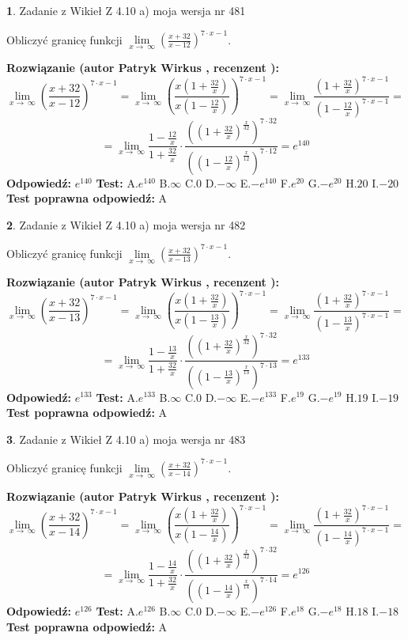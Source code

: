 \documentclass[12pt, a4paper]{article}
\theoremstyle{definition} %
\newtheorem{zad}{}
\newcommand{\zadStart}[1]{\begin{zad}#1\newline}
\newcommand{\zadStop}{\end{zad}}
\newcommand{\rozwStart}[2]{\noindent \textbf{Rozwiązanie (autor #1 , recenzent #2): }\newline}
\newcommand{\rozwStop}{\newline}
\newcommand{\odpStart}{\noindent \textbf{Odpowiedź:}\newline}
\newcommand{\odpStop}{\newline}
\newcommand{\testStart}{\noindent \textbf{Test:}\newline}
\newcommand{\testStop}{\newline}
\newcommand{\kluczStart}{\noindent \textbf{Test poprawna odpowiedź:}\newline}
\newcommand{\kluczStop}{\newline}
\begin{document}
\zadStart{Zadanie z Wikieł Z 4.10 a) moja wersja nr 481}

Obliczyć granicę funkcji  $\lim\limits_{x\to\ \infty}(\frac{x+32}{x-12})^{7\cdot x-1}$.
\zadStop
\rozwStart{Patryk Wirkus}{}
$$\lim\limits_{x\to\ \infty}(\frac{x+32}{x-12})^{7\cdot x-1} = \lim\limits_{x\to\ \infty}(\frac{x(1+\frac{32}{x})}{x(1-\frac{12}{x})})^{7\cdot x-1}=\lim\limits_{x\to\ \infty}\frac{(1+\frac{32}{x})^{7\cdot x-1}}{(1-\frac{12}{x})^{7\cdot x-1}}=$$
$$=\lim\limits_{x\to\ \infty}\frac{1-\frac{12}{x}}{1+\frac{32}{x}}\cdot\frac{((1+\frac{32}{x})^{\frac{x}{32}})^{7\cdot32}}{((1-\frac{12}{x})^{\frac{x}{12}})^{7\cdot12}}=e^{140}$$
\rozwStop
\odpStart
$e^{140}$
\odpStop
\testStart
A.$e^{140}$ B.$\infty$ C.$0$ D.$-\infty$ E.$-e^{140}$
F.$e^{20}$ G.$-e^{20}$
H.$20$
I.$-20$
\testStop
\kluczStart
A
\kluczStop



\zadStart{Zadanie z Wikieł Z 4.10 a) moja wersja nr 482}

Obliczyć granicę funkcji  $\lim\limits_{x\to\ \infty}(\frac{x+32}{x-13})^{7\cdot x-1}$.
\zadStop
\rozwStart{Patryk Wirkus}{}
$$\lim\limits_{x\to\ \infty}(\frac{x+32}{x-13})^{7\cdot x-1} = \lim\limits_{x\to\ \infty}(\frac{x(1+\frac{32}{x})}{x(1-\frac{13}{x})})^{7\cdot x-1}=\lim\limits_{x\to\ \infty}\frac{(1+\frac{32}{x})^{7\cdot x-1}}{(1-\frac{13}{x})^{7\cdot x-1}}=$$
$$=\lim\limits_{x\to\ \infty}\frac{1-\frac{13}{x}}{1+\frac{32}{x}}\cdot\frac{((1+\frac{32}{x})^{\frac{x}{32}})^{7\cdot32}}{((1-\frac{13}{x})^{\frac{x}{13}})^{7\cdot13}}=e^{133}$$
\rozwStop
\odpStart
$e^{133}$
\odpStop
\testStart
A.$e^{133}$ B.$\infty$ C.$0$ D.$-\infty$ E.$-e^{133}$
F.$e^{19}$ G.$-e^{19}$
H.$19$
I.$-19$
\testStop
\kluczStart
A
\kluczStop



\zadStart{Zadanie z Wikieł Z 4.10 a) moja wersja nr 483}

Obliczyć granicę funkcji  $\lim\limits_{x\to\ \infty}(\frac{x+32}{x-14})^{7\cdot x-1}$.
\zadStop
\rozwStart{Patryk Wirkus}{}
$$\lim\limits_{x\to\ \infty}(\frac{x+32}{x-14})^{7\cdot x-1} = \lim\limits_{x\to\ \infty}(\frac{x(1+\frac{32}{x})}{x(1-\frac{14}{x})})^{7\cdot x-1}=\lim\limits_{x\to\ \infty}\frac{(1+\frac{32}{x})^{7\cdot x-1}}{(1-\frac{14}{x})^{7\cdot x-1}}=$$
$$=\lim\limits_{x\to\ \infty}\frac{1-\frac{14}{x}}{1+\frac{32}{x}}\cdot\frac{((1+\frac{32}{x})^{\frac{x}{32}})^{7\cdot32}}{((1-\frac{14}{x})^{\frac{x}{14}})^{7\cdot14}}=e^{126}$$
\rozwStop
\odpStart
$e^{126}$
\odpStop
\testStart
A.$e^{126}$ B.$\infty$ C.$0$ D.$-\infty$ E.$-e^{126}$
F.$e^{18}$ G.$-e^{18}$
H.$18$
I.$-18$
\testStop
\kluczStart
A
\kluczStop
\end{document}
